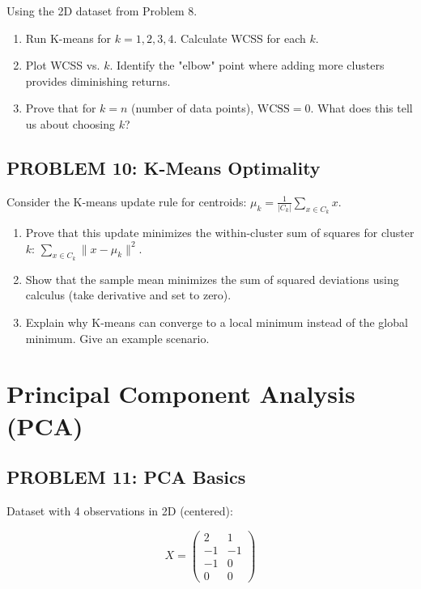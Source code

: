 \documentclass[12pt]{article}
\begin{document}
Using the 2D dataset from Problem 8.

\begin{enumerate}
\item[(a)] Run K-means for \(k = 1, 2, 3, 4\). Calculate WCSS for each \(k\).
\item[(b)] Plot WCSS vs. \(k\). Identify the "elbow" point where adding more clusters provides diminishing returns.
\item[(c)] Prove that for \(k = n\) (number of data points), \(\text{WCSS} = 0\). What does this tell us about choosing \(k\)?
\end{enumerate}

\subsection*{PROBLEM 10: K-Means Optimality}

Consider the K-means update rule for centroids: \(\mu_k = \frac{1}{|C_k|}\sum_{x \in C_k} x\).

\begin{enumerate}
\item[(a)] Prove that this update minimizes the within-cluster sum of squares for cluster \(k\): \(\sum_{x \in C_k} \|x - \mu_k\|^2\).
\item[(b)] Show that the sample mean minimizes the sum of squared deviations using calculus (take derivative and set to zero).
\item[(c)] Explain why K-means can converge to a local minimum instead of the global minimum. Give an example scenario.
\end{enumerate}

\newpage
\section*{Principal Component Analysis (PCA)}

\subsection*{PROBLEM 11: PCA Basics}

Dataset with 4 observations in 2D (centered):

\[
X = \begin{pmatrix}
2 & 1 \\
-1 & -1 \\
-1 & 0 \\
0 & 0
\end{pmatrix}
\]
\end{document}
